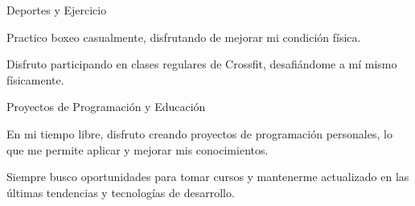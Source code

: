 
\begin{cventries}

  \cventry
    {Deportes y Ejercicio} %
    {} %
    {} %
    {} %
    {
      \begin{cvitems} %
        \item {Practico boxeo casualmente, disfrutando de mejorar mi condición física.}
        \item {Disfruto participando en clases regulares de Crossfit, desafiándome a mí mismo físicamente.}
      \end{cvitems}
    }

  \cventry
    {Proyectos de Programación y Educación} %
    {} %
    {} %
    {} %
    {
      \begin{cvitems} %
        \item {En mi tiempo libre, disfruto creando proyectos de programación personales, lo que me permite aplicar y mejorar mis conocimientos.}
        \item {Siempre busco oportunidades para tomar cursos y mantenerme actualizado en las últimas tendencias y tecnologías de desarrollo.}
      \end{cvitems}
    }


\end{cventries}
